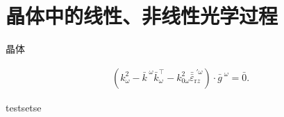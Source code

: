 
\chapter{晶体中的线性、非线性光学过程}

%

晶体%

\begin{align} \label{eq:r-2}
	\left( k^{2}_{\omega} - \bar{k}^{\;\!\omega}\bar{k}^{\intercal}_{\omega} - k^{2}_{0\omega} \bar{\bar{\varepsilon}}^{\;\!\prime\omega}_{\mathrm{r} z} \right) \cdot \bar{g}^{\;\!\omega} = \bar{0}.
\end{align}

testsetse\cite{ossikovskiConstitutiveRelationsOptically2021}

